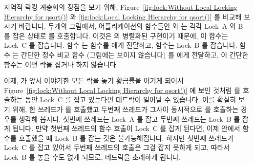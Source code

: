 지역적 락킹 계층화의 장점을 보기 위해,
Figure~\ref{fig:lock:Without Local Locking Hierarchy for qsort()} 와
\ref{fig:lock:Local Locking Hierarchy for qsort()} 를 비교해 보시기 바랍니다.
두개의 그림에서, 어플리케이션의 함수들인  와  는 각각
Lock~A 와 B 를 잡은 상태로  를 호출합니다.
이것은  의 병렬화된 구현이기 때문에, 이 함수는 Lock~C 를 잡습니다.
함수  는  함수를  에게 전달하고, 
함수는 Lock~B 를 잡습니다.
함수  는 간단한 정수 비교 함수 (그림에는 보이지 않습니다) 를
 에게 전달하고, 이 간단한 함수는 어떤 락을 잡거나 하지 않습니다.

이제,  가 앞서 이야기한 모든 락을 놓기 황금률을 어기게 되어서
Figure~\ref{fig:lock:Without Local Locking Hierarchy for qsort()} 에 보인
것처럼  를 호출하는 동안 Lock~C 를 잡고 있는다면 데드락이 일어날 수
있습니다.
이를 확실히 보기 위해, 한 쓰레드가  를 호출했고 두번째 쓰레드가
그사이 동시적으로  를 호출하는 경우를 생각해 봅시다.
첫번째 쓰레드는 Lock~A 를 잡고 두번째 쓰레드는 Lock~B 를 잡게 됩니다.
만약 첫번째 쓰레드의  함수 호출이 Lock~C 를 잡게 된다면, 이제
 안에서  함수를 호출했을 때 Lock~B 를 잡는 것은
불가능해집니다.
하지만 첫번째 쓰레드가 Lock~C 를 잡고 있어서 두번째 쓰레드의 
호출은 그걸 잡지 못하게 되고, 따라서 Lock~B 를 놓을 수도 없게 되므로, 데드락을
초래하게 됩니다.

